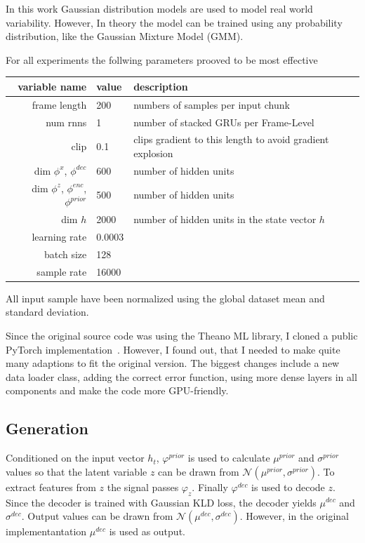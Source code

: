 \documentclass[12pt]{article}
\begin{document}
In this work Gaussian distribution models are used to model real world variability.
However, In theory the model can be trained using any probability distribution, like the Gaussian Mixture Model (GMM).

For all experiments the follwing parameters prooved to be most effective
\begin{center}
\begin{tabular}{ r | l | l }
variable name & value & description \\
\hline
frame length & 200 & numbers of samples per input chunk\\
num rnns & 1 & number of stacked GRUs per Frame-Level \\
clip & 0.1 & clips gradient to this length to avoid gradient explosion \\
dim $\phi^x$, $\phi^{dec}$ & 600 & number of hidden units \\
dim $\phi^z$, $\phi^{enc}$, $\phi^{prior}$ & 500 & number of hidden units \\
dim $h$ & 2000 & number of hidden units in the state vector $h$ \\
learning rate & 0.0003 & \\
batch size & 128 & \\
sample rate & 16000 & \\
\end{tabular}
\end{center}

All input sample have been normalized using the global dataset mean and standard deviation.


Since the original source code was using the Theano ML library, I cloned a public PyTorch implementation~\cite{VRNNgit}.
However, I found out, that I needed to make quite many adaptions to fit the original version.
The biggest changes include a new data loader class, adding the correct error function, using more dense layers in all components and make the code more GPU-friendly. 



\subsection{Generation}
Conditioned on the input vector $h_t$, $\varphi^{prior}$ is used to calculate $\mu^{prior}$ and $\sigma^{prior}$ values so that the latent variable $z$ can be drawn from $\mathcal{N}(\mu^{prior}, \sigma^{prior})$.
To extract features from $z$ the signal passes $\varphi_z$.
Finally $\varphi^{dec}$ is used to decode $z$.
Since the decoder is trained with Gaussian KLD loss, the decoder yields $\mu^{dec}$ and $\sigma^{dec}$.
Output values can be drawn from $\mathcal{N}(\mu^{dec}, \sigma^{dec})$.
However, in the original implementantation $\mu^{dec}$ is used as output.
\end{document}
